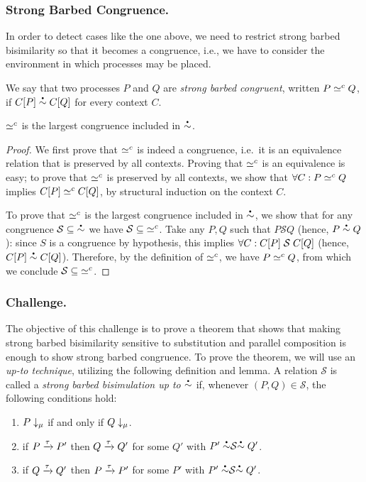 \subsubsection{Strong Barbed Congruence.}
In order to detect cases like the one above, we need to restrict strong barbed bisimilarity so that it becomes a congruence,
i.e.,
we have to consider the environment in which processes may be placed.

We say that two processes \( P \) and \( Q \) are \emph{strong barbed congruent}, written \( P \simeq^c Q \), if \( \sbbisim{\applyctx{C}{P}}{\applyctx{C}{Q}} \) for every context \( C \).

\begin{lemma}
  \( \simeq^c \) is the largest congruence included in
  \( \sbbisim{}{} \).
\end{lemma}
\begin{proof}
  We first prove that \( \simeq^c \) is indeed a congruence, i.e.~it is an
  equivalence relation that is preserved by all contexts.  Proving that \(
  \simeq^c \) is an equivalence is easy; to prove that \( \simeq^c \)  is
  preserved by all contexts, we show that $\forall C: P \simeq^c Q$ implies
  $C[P] \simeq^c C[Q]$, by structural induction on the
  context $C$.

  To prove that \(\simeq^c\) is the largest congruence included in
  \(\sbbisim{}{}\), we show that for any congruence $\mathcal{S} \subseteq
  {\sbbisim{}{}}$ we have $\mathcal{S} \subseteq { \simeq^c }$. Take any $P,Q$
  such that $P \mathrel{\mathcal{S}} Q$ (hence, $\sbbisim{P}{Q}$): since $S$ is
  a congruence by hypothesis, this implies $\forall C: C[P]
  \mathrel{\mathcal{S}} C[Q]$ (hence,
  $\sbbisim{\applyctx{C}{P}}{\applyctx{C}{Q}}$). %
  Therefore, by the definition of \(\simeq^c\), we have $P \simeq^c Q$,
  from which we conclude $\mathcal{S} \subseteq { \simeq^c }$.
\end{proof}

\subsubsection{Challenge.}
The objective of this challenge is to prove a theorem that shows that
making strong barbed bisimilarity sensitive to substitution and
parallel composition is enough to show strong barbed
congruence.
To prove the theorem, we will use an \emph{up-to technique}, utilizing the following definition and lemma.
A relation \( \mathcal{S} \) is called a \emph{strong barbed bisimulation up to \( \sbbisim{}{} \)} if, whenever \( (P,Q) \in \mathcal{S} \), the following conditions hold:
\begin{enumerate}
\item \( P\downarrow_{\mu} \) if and only if \( Q\downarrow_{\mu} \).
\item if \( P \xrightarrow{\tau} P' \) then \( Q \xrightarrow{\tau} Q' \) for some \( Q' \) with \( \uptosbb{P'}{\mathcal{S}}{Q'} \).
\item if \( Q \xrightarrow{\tau} Q' \) then \( P \xrightarrow{\tau} P' \) for some \( P' \) with \( \uptosbb{P'}{\mathcal{S}}{Q'} \).
\end{enumerate}

